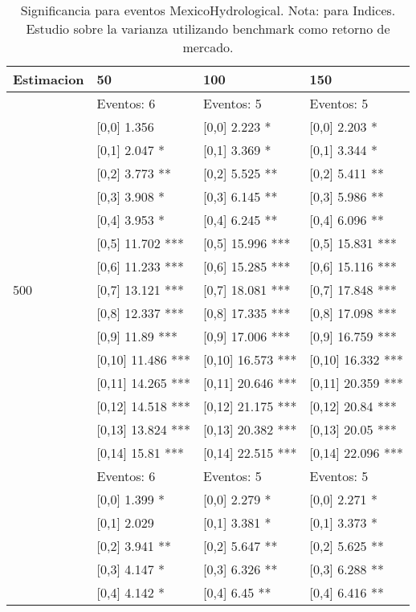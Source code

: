 \begin{table}

\caption{Significancia para eventos MexicoHydrological. Nota: para Indices. Estudio sobre la varianza utilizando benchmark como retorno de mercado.}
\centering
\begin{tabular}[t]{llll}
\toprule
Estimacion & 50 & 100 & 150\\
\midrule
 & Eventos:  6 & Eventos:  5 & Eventos:  5\\
 & {}[0,0] 1.356 & {}[0,0] 2.223 * & {}[0,0] 2.203 *\\
 & {}[0,1] 2.047 * & {}[0,1] 3.369 * & {}[0,1] 3.344 *\\
 & {}[0,2] 3.773 ** & {}[0,2] 5.525 ** & {}[0,2] 5.411 **\\
 & {}[0,3] 3.908 * & {}[0,3] 6.145 ** & {}[0,3] 5.986 **\\
\addlinespace
 & {}[0,4] 3.953 * & {}[0,4] 6.245 ** & {}[0,4] 6.096 **\\
 & {}[0,5] 11.702 *** & {}[0,5] 15.996 *** & {}[0,5] 15.831 ***\\
 & {}[0,6] 11.233 *** & {}[0,6] 15.285 *** & {}[0,6] 15.116 ***\\
500 & {}[0,7] 13.121 *** & {}[0,7] 18.081 *** & {}[0,7] 17.848 ***\\
 & {}[0,8] 12.337 *** & {}[0,8] 17.335 *** & {}[0,8] 17.098 ***\\
\addlinespace
 & {}[0,9] 11.89 *** & {}[0,9] 17.006 *** & {}[0,9] 16.759 ***\\
 & {}[0,10] 11.486 *** & {}[0,10] 16.573 *** & {}[0,10] 16.332 ***\\
 & {}[0,11] 14.265 *** & {}[0,11] 20.646 *** & {}[0,11] 20.359 ***\\
 & {}[0,12] 14.518 *** & {}[0,12] 21.175 *** & {}[0,12] 20.84 ***\\
 & {}[0,13] 13.824 *** & {}[0,13] 20.382 *** & {}[0,13] 20.05 ***\\
\addlinespace
 & {}[0,14] 15.81 *** & {}[0,14] 22.515 *** & {}[0,14] 22.096 ***\\
 & Eventos:  6 & Eventos:  5 & Eventos:  5\\
 & {}[0,0] 1.399 * & {}[0,0] 2.279 * & {}[0,0] 2.271 *\\
 & {}[0,1] 2.029 & {}[0,1] 3.381 * & {}[0,1] 3.373 *\\
 & {}[0,2] 3.941 ** & {}[0,2] 5.647 ** & {}[0,2] 5.625 **\\
\addlinespace
 & {}[0,3] 4.147 * & {}[0,3] 6.326 ** & {}[0,3] 6.288 **\\
 & {}[0,4] 4.142 * & {}[0,4] 6.45 ** & {}[0,4] 6.416 **\\

\end{tabular}
\end{table}
